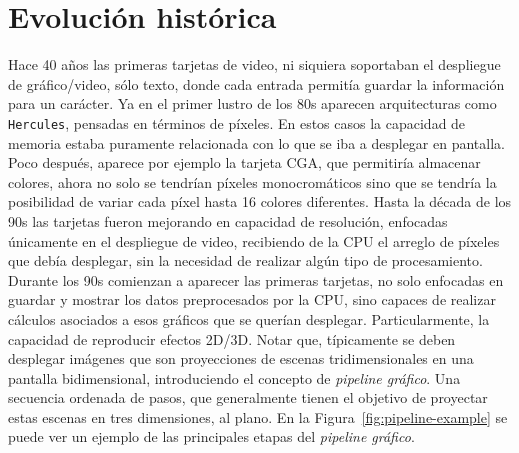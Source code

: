 \chapter{Evolución histórica}\label{AneC}

Hace 40 años las primeras tarjetas de video, ni siquiera soportaban el despliegue de gráfico/video, sólo texto, donde cada entrada permitía guardar la información para un carácter.
Ya en el primer lustro de los 80s aparecen arquitecturas como \texttt{Hercules}, pensadas en términos de píxeles. En estos casos la capacidad de memoria estaba puramente relacionada con lo que se iba a desplegar en pantalla. Poco después, aparece por ejemplo la tarjeta CGA, que permitiría almacenar colores, ahora no solo se tendrían píxeles monocromáticos sino que se tendría la posibilidad de variar cada píxel hasta 16 colores diferentes.
Hasta la década de los 90s las tarjetas fueron mejorando en capacidad de resolución, enfocadas únicamente en el despliegue de video, recibiendo de la CPU el arreglo de píxeles que debía desplegar, sin la necesidad de realizar algún tipo de procesamiento. Durante los 90s comienzan a aparecer las primeras tarjetas, no solo enfocadas en guardar y mostrar los datos preprocesados por la CPU, sino capaces de realizar cálculos asociados a esos gráficos que se querían desplegar. Particularmente, la capacidad de reproducir efectos 2D/3D. Notar que, típicamente se deben desplegar imágenes que son proyecciones de escenas tridimensionales en una pantalla bidimensional, introduciendo el concepto de \textit{pipeline gráfico}. Una secuencia ordenada de pasos, que generalmente tienen el objetivo de proyectar estas escenas en tres dimensiones, al plano. En la Figura~\ref{fig:pipeline-example} se puede ver un ejemplo de las principales etapas del \textit{pipeline gráfico}.

